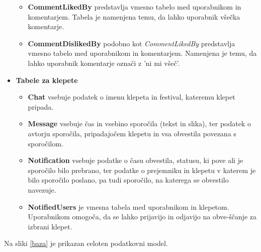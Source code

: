 \documentclass[a4paper,12pt,openright]{book}
\begin{document}
\begin{itemize}
\begin{itemize}
            \item \textbf{CommentLikedBy} predstavlja vmesno tabelo med uporabnikom in komentarjem. Tabela je namenjena temu, da lahko uporabnik všečka komentarje.
            \item \textbf{CommentDislikedBy} podobno kot \textit{CommentLikedBy} predstavlja vmesno tabelo med uporabnikom in komentarjem. Namenjena je temu, da lahko uporabnik komentarje označi z 'ni mi všeč'.
        \end{itemize}
    \item \textbf{Tabele za klepete}
        \begin{itemize}
            \item \textbf{Chat} vsebuje podatek o imenu klepeta in festival, kateremu klepet pripada.
            \item \textbf{Message} vsebuje čas in vsebino sporočila (tekst in slika), ter podatek o avtorju sporočila, pripadajočem klepetu in vsa obvestila povezana s sporočilom.
            \item \textbf{Notification} vsebuje podatke o času obvestila, statusu, ki pove ali je sporočilo bilo prebrano, ter podatke o prejemniku in klepetu v katerem je bilo sporočilo poslano, pa tudi sporočilo, na katerega se obvestilo navezuje.
            \item \textbf{NotifiedUsers} je vmesna tabela med uporabnikom in klepetom. Uporabnikom omogoča, da se lahko prijavijo in odjavijo na obve-ščanje za izbrani klepet.
        \end{itemize}
\end{itemize}

Na sliki \ref{baza} je prikazan celoten podatkovni model.
\end{document}
